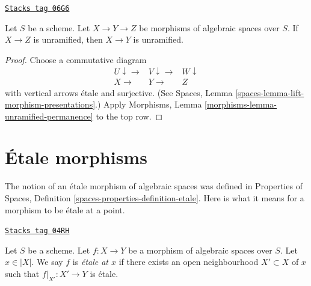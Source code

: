\begin{lemma}
\label{spaces-morphisms-lemma-permanence-unramified}
\href{https://stacks.math.columbia.edu/tag/06G6}{\texttt{Stacks tag 06G6}}

Let $S$ be a scheme.
Let $X \to Y \to Z$ be morphisms of algebraic spaces over $S$.
If $X \to Z$ is unramified, then $X \to Y$ is unramified.
\end{lemma}

\begin{proof}
Choose a commutative diagram
$$
\begin{array}{ccc}U \downarrow\longrightarrow & V \downarrow\longrightarrow & W \downarrow \\ X \longrightarrow & Y \longrightarrow & Z\end{array}
$$
with vertical arrows \'etale and surjective. (See
Spaces, Lemma \ref{spaces-lemma-lift-morphism-presentations}.)
Apply
Morphisms, Lemma \ref{morphisms-lemma-unramified-permanence}
to the top row.
\end{proof}

\section{\'Etale morphisms}
\label{spaces-morphisms-section-etale}
The notion of an \'etale morphism of algebraic spaces was defined in
Properties of Spaces, Definition \ref{spaces-properties-definition-etale}.
Here is what it means for a morphism to be \'etale at a point.

\begin{definition}[Etale]
\label{spaces-morphisms-definition-etale}
\href{https://stacks.math.columbia.edu/tag/04RH}{\texttt{Stacks tag 04RH}}

Let $S$ be a scheme.
Let $f : X \to Y$ be a morphism of algebraic spaces over $S$.
Let $x \in |X|$. We say $f$ is {\it \'etale at $x$} if there
exists an open neighbourhood $X' \subset X$ of $x$ such that
$f|_{X'} : X' \to Y$ is \'etale.
\end{definition}

